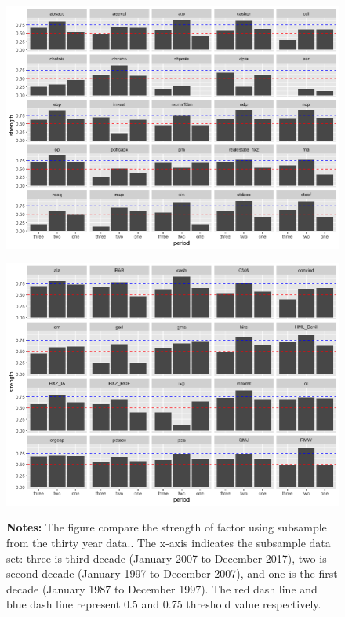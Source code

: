 \begin{landscape}
	\begin{figure}[ht]
		\includegraphics[scale = 0.75]{thirty_decompose_V}
		\centering
	\end{figure}
\end{landscape}

\begin{landscape}
	\begin{figure}[ht]
		\includegraphics[scale = 0.75]{thirty_decompose_VI}
		\centering
		\begin{minipage}{\textwidth}
			{\footnotesize {\bf Notes:} The figure compare the strength of factor using subsample from the thirty year data.. The x-axis indicates the subsample data set: three is third decade (January 2007 to December 2017), two is second decade (January 1997 to December 2007), and one is the first decade (January 1987 to December 1997). The red dash line and blue dash line represent 0.5 and 0.75 threshold value respectively.}
		\end{minipage}
	\end{figure}
\end{landscape}



